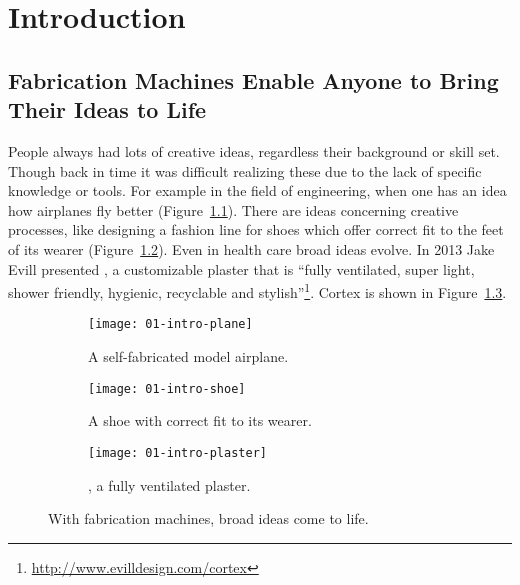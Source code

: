\documentclass[../ClassicThesis.tex]{subfiles}
\begin{document}
\chapter{Introduction}
\label{ch:introduction}

\section{Fabrication Machines Enable Anyone to Bring Their Ideas to Life}
\label{sec:introduction}



People always had lots of creative ideas, regardless their
background or skill set. Though back in time it was
difficult realizing these due to the lack of specific
knowledge or tools. For example in the field of engineering,
when one has an idea how airplanes fly better
(Figure~\ref{fig:intro-ideas:plane}). There are ideas
concerning creative processes, like designing a fashion line
for shoes which offer correct fit to the feet of its wearer
(Figure~\ref{fig:intro-ideas:shoe}). Even in health care
broad ideas evolve. In 2013 Jake Evill presented
, a customizable plaster that is \enquote{fully
  ventilated, super light, shower friendly, hygienic,
  recyclable and
  stylish}\footnote{\url{http://www.evilldesign.com/cortex}}.
Cortex is shown in Figure~\ref{fig:intro-ideas:plaster}.

\begin{figure}[ht]
  \centering
  \begin{subfigure}[b]{\textwidth}
    \texttt{[image: 01-intro-plane]}
    \caption{A self-fabricated model airplane.}
    \label{fig:intro-ideas:plane}
  \end{subfigure}
  \begin{subfigure}[b]{\textwidth}
    \texttt{[image: 01-intro-shoe]}
    \caption{A shoe with correct fit to its wearer.}
    \label{fig:intro-ideas:shoe}
  \end{subfigure}
  \begin{subfigure}[c]{\textwidth}
    \texttt{[image: 01-intro-plaster]}
    \caption{, a fully ventilated plaster.}
    \label{fig:intro-ideas:plaster}
  \end{subfigure}
  \caption{With fabrication machines, broad ideas come to life.}
  \label{fig:intro-ideas}
\end{figure}
\end{document}
